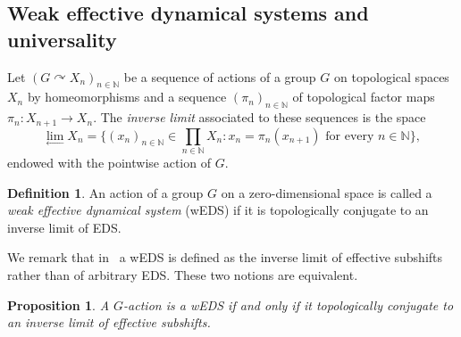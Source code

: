 \documentclass{article}
\newtheorem{proposition}[theorem]{Proposition}
\theoremstyle{definition}
\newtheorem{definition}[theorem]{Definition}
\theoremstyle{plain}
\newcommand{\NN}{\mathbb{N}}
\newcommand{\define}[1]{\textit{#1}}
\begin{document}
    
    



\subsection{Weak effective dynamical systems and universality}

Let $(G \curvearrowright X_n)_{n \in \NN}$ be a sequence of actions of a group $G$ on topological spaces $X_n$ by homeomorphisms and a sequence $(\pi_n)_{n \in \NN}$ of topological factor maps $\pi_{n}\colon X_{n+1} \to X_{n}$. The \define{inverse limit} associated to these sequences is the space \[ \lim_{\leftarrow} X_n = \{ (x_n)_{n \in \NN} \in \prod_{n \in \NN} X_n : x_n = \pi_{n}(x_{n+1}) \mbox{ for every } n \in \NN \},     \]
endowed with the pointwise action of $G$.

\begin{definition}
    An action of a group $G$ on a zero-dimensional space is called a \define{weak effective dynamical system} (wEDS) if it is topologically conjugate to an inverse limit of EDS.
\end{definition}

We remark that in~\cite{BarCarRoj2025} a wEDS is defined as the inverse limit of effective subshifts rather than of arbitrary EDS. These two notions are equivalent.

\begin{proposition}\label{prop:wEDS_effective_subshift}
    A $G$-action is a wEDS if and only if it topologically conjugate to an inverse limit of effective subshifts.
\end{proposition}
\end{document}
